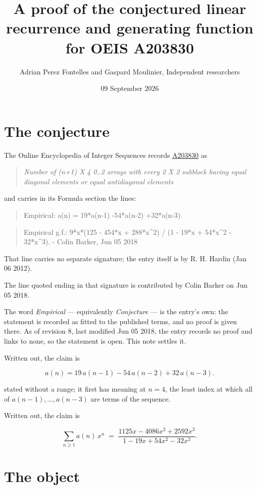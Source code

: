 \documentclass[11pt]{article}
\title{A proof of the conjectured linear recurrence and generating function for OEIS A203830}
\author{Adrian Perez Fontelles and Gaspard Moulinier, Independent researchers}
\date{09 September 2026}
\theoremstyle{definition}
\begin{document}
\maketitle
\section{The conjecture}

The Online Encyclopedia of Integer Sequences records \href{https://oeis.org/A203830}{A203830} as

\begin{quote}\itshape Number of (n+1) X 4 0..2 arrays with every 2 X 2 subblock having equal diagonal elements or equal antidiagonal elements\end{quote}

and carries in its Formula section the lines:

\begin{quote}\ttfamily Empirical: a(n) = 19*a(n-1) -54*a(n-2) +32*a(n-3).\end{quote}

\begin{quote}\ttfamily Empirical g.f.: 9*x*(125 - 454*x + 288*x\textasciicircum{}2) / (1 - 19*x + 54*x\textasciicircum{}2 - 32*x\textasciicircum{}3). - Colin Barker, Jun 05 2018\end{quote}

That line carries no separate signature; the entry itself is by R. H. Hardin (Jan 06 2012).

The line quoted ending in that signature is contributed by Colin Barker on Jun 05 2018.

The word {\itshape Empirical} --- equivalently {\itshape Conjecture} --- is the entry's own: the statement is recorded as fitted to the published terms, and no proof is given there. As of revision 8, last modified Jun 05 2018, the entry records no proof and links to none, so the statement is open. This note settles it.

Written out, the claim is

\[a(n) = 19\,a(n-1) - 54\,a(n-2) + 32\,a(n-3).\]

stated without a range; it first has meaning at $n = 4$, the least index at which all of $a(n-1),\dots,a(n-3)$ are terms of the sequence.

Written out, the claim is

\[\sum_{n \ge 1} a(n)\,x^n \;=\; \frac{1125x - 4086x^{2} + 2592x^{3}}{1 - 19x + 54x^{2} - 32x^{3}}.\]

\section{The object}
\end{document}
